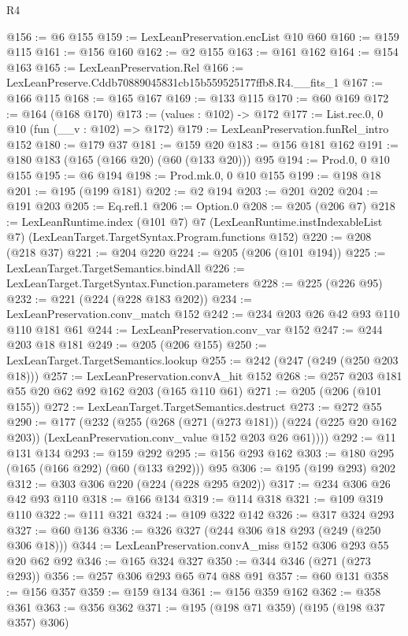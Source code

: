 \begin{lexlean}{R4}
\begin{coremodule}
@156 := @6 @155
@159 := LexLeanPreservation.encList @10 @60
@160 := @159 @115
@161 := @156 @160
@162 := @2 @155
@163 := @161 @162
@164 := @154 @163
@165 := LexLeanPreservation.Rel
@166 := LexLeanPreserve.Cddb70889045831cb15b559525177ffb8.R4.__fits_1
@167 := @166 @115
@168 := @165 @167
@169 := @133 @115
@170 := @60 @169
@172 := @164 (@168 @170)
@173 := (values : @102) -> @172
@177 := List.rec.{0, 0} @10 (fun (__v : @102) => @172)
@179 := LexLeanPreservation.funRel_intro @152
@180 := @179 @37
@181 := @159 @20
@183 := @156 @181 @162
@191 := @180 @183 (@165 (@166 @20) (@60 (@133 @20))) @95
@194 := Prod.{0, 0} @10 @155
@195 := @6 @194
@198 := Prod.mk.{0, 0} @10 @155
@199 := @198 @18
@201 := @195 (@199 @181)
@202 := @2 @194
@203 := @201 @202
@204 := @191 @203
@205 := Eq.refl.{1}
@206 := Option.{0}
@208 := @205 (@206 @7)
@218 := LexLeanRuntime.index
    (@101 @7)
    @7
    (LexLeanRuntime.instIndexableList @7)
    (LexLeanTarget.TargetSyntax.Program.functions @152)
@220 := @208 (@218 @37)
@221 := @204 @220
@224 := @205 (@206 (@101 @194))
@225 := LexLeanTarget.TargetSemantics.bindAll
@226 := LexLeanTarget.TargetSyntax.Function.parameters
@228 := @225 (@226 @95)
@232 := @221 (@224 (@228 @183 @202))
@234 := LexLeanPreservation.conv_match @152
@242 := @234 @203 @26 @42 @93 @110 @110 @181 @61
@244 := LexLeanPreservation.conv_var @152
@247 := @244 @203 @18 @181
@249 := @205 (@206 @155)
@250 := LexLeanTarget.TargetSemantics.lookup
@255 := @242 (@247 (@249 (@250 @203 @18)))
@257 := LexLeanPreservation.convA_hit @152
@268 := @257 @203 @181 @55 @20 @62 @92 @162 @203 (@165 @110 @61)
@271 := @205 (@206 (@101 @155))
@272 := LexLeanTarget.TargetSemantics.destruct
@273 := @272 @55
@290 := @177
    (@232
      (@255
        (@268
          (@271 (@273 @181))
          (@224 (@225 @20 @162 @203))
          (LexLeanPreservation.conv_value @152 @203 @26 @61))))
@292 := @11 @131 @134
@293 := @159 @292
@295 := @156 @293 @162
@303 := @180 @295 (@165 (@166 @292) (@60 (@133 @292))) @95
@306 := @195 (@199 @293) @202
@312 := @303 @306 @220 (@224 (@228 @295 @202))
@317 := @234 @306 @26 @42 @93 @110
@318 := @166 @134
@319 := @114 @318
@321 := @109 @319 @110
@322 := @111 @321
@324 := @109 @322 @142
@326 := @317 @324 @293
@327 := @60 @136
@336 := @326 @327 (@244 @306 @18 @293 (@249 (@250 @306 @18)))
@344 := LexLeanPreservation.convA_miss @152 @306 @293 @55 @20 @62 @92
@346 := @165 @324 @327
@350 := @344 @346 (@271 (@273 @293))
@356 := @257 @306 @293 @65 @74 @88 @91
@357 := @60 @131
@358 := @156 @357
@359 := @159 @134
@361 := @156 @359 @162
@362 := @358 @361
@363 := @356 @362
@371 := @195 (@198 @71 @359) (@195 (@198 @37 @357) @306)

\end{coremodule}
\end{lexlean}

